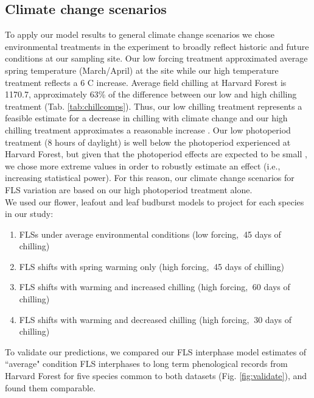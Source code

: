 \documentclass[12pt]{article}\usepackage[]{graphicx}\usepackage[]{color}
\begin{document}
\subsection*{Climate change scenarios}
\noindent To apply our model results to general climate change scenarios we chose environmental treatments in the experiment to broadly reflect historic and future conditions at our sampling site. Our low forcing treatment approximated average spring temperature (March/April) at the site while our high temperature treatment reflects a 6 \degree C increase. Average field chilling \citep[calculated from 15 October - 15 April, measured in Chill Hours,][]{Weinberger:1950aa} at Harvard Forest is 1170.7, approximately  63\% of the difference between our low and high chilling treatment (Tab. \ref{tab:chillcomps}). Thus, our low chilling treatment represents a feasible estimate for a decrease in chilling with climate change and our high chilling treatment approximates a reasonable increase \citep{Luedeling:2012aa}. Our low photoperiod treatment (8 hours of daylight) is well below the photoperiod experienced at Harvard Forest, but given that the photoperiod effects are expected to be small \citep{Laube:2014a}, we chose more extreme values in order to robustly estimate an effect (i.e., increasing statistical power). For this reason, our climate change scenarios for FLS variation are based on our high photoperiod treatment alone.\\


\noindent We used our flower, leafout and leaf budburst models to project for each species in our study:
\begin{enumerate}
\item FLSs under average environmental conditions  (low forcing, $~$45 days of chilling)
\item FLS shifts with spring warming only (high forcing, $~$45 days of chilling)
\item FLS shifts with warming and increased chilling (high forcing, $~$60 days of chilling)
\item FLS shifts with warming and decreased chilling (high forcing, $~$30 days of chilling)
\end{enumerate}

\noindent To validate our predictions, we compared our FLS interphase model estimates of ``average" condition FLS interphases to long term phenological records from Harvard Forest \citep{OKeefe2015} for five species common to both datasets (Fig. \ref{fig:validate}), and found them comparable. \\
\end{document}
